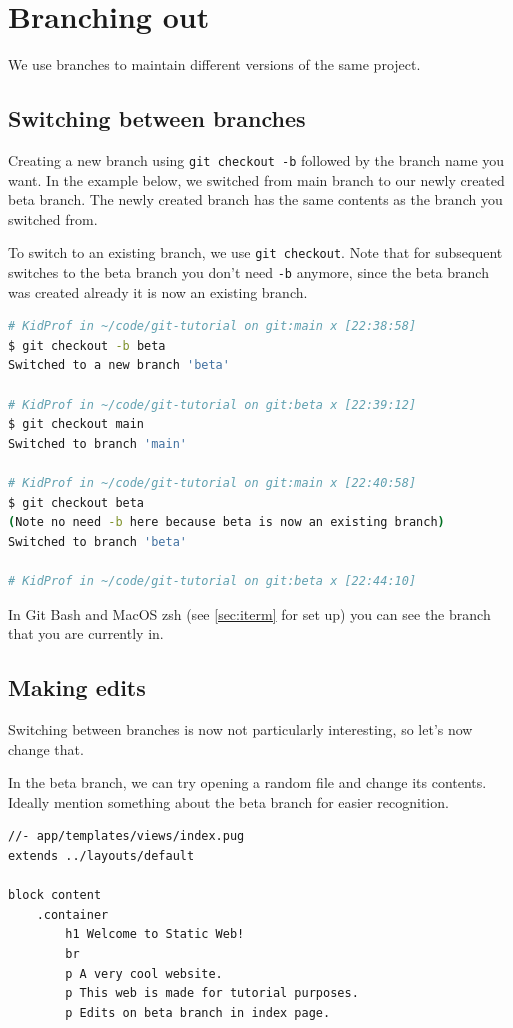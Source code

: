 \section{Branching out}
\label{sec:branch}

We use branches to maintain different versions of the same project. 

\subsection*{Switching between branches}

Creating a new branch using \texttt{git checkout -b} followed by the branch name you want. In the example below, we switched from main branch to our newly created beta branch. The newly created branch has the same contents as the branch you switched from.

To switch to an existing branch, we use \texttt{git checkout}. Note that for subsequent switches to the beta branch you don't need \texttt{-b} anymore, since the beta branch was created already it is now an existing branch.

\begin{lstlisting}[language=bash]
# KidProf in ~/code/git-tutorial on git:main x [22:38:58]
$ git checkout -b beta
Switched to a new branch 'beta'

# KidProf in ~/code/git-tutorial on git:beta x [22:39:12]
$ git checkout main
Switched to branch 'main'

# KidProf in ~/code/git-tutorial on git:main x [22:40:58]
$ git checkout beta
(Note no need -b here because beta is now an existing branch)
Switched to branch 'beta'

# KidProf in ~/code/git-tutorial on git:beta x [22:44:10]
\end{lstlisting}

In Git Bash and MacOS zsh (see \cref{sec:iterm} for set up) you can see the branch that you are currently in.

\subsection*{Making edits}

Switching between branches is now not particularly interesting, so let's now change that.

In the beta branch, we can try opening a random file and change its contents. Ideally mention something about the beta branch for easier recognition.

\begin{lstlisting}[language=pug]
//- app/templates/views/index.pug
extends ../layouts/default

block content
	.container
		h1 Welcome to Static Web!
		br
		p A very cool website.
		p This web is made for tutorial purposes.
		p Edits on beta branch in index page.
\end{lstlisting}

